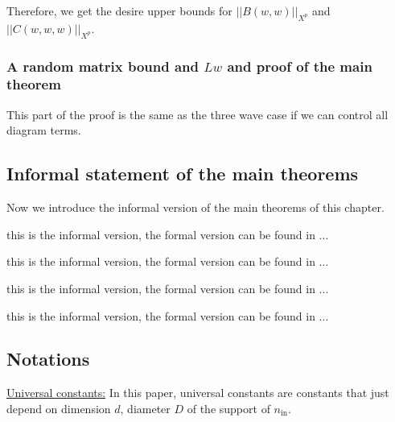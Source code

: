 Therefore, we get the desire upper bounds for $||B(w,w)||_{X^p}$ and $||C(w,w,w)||_{X^p}$.

\subsubsection{A random matrix bound and $Lw$ and proof of the main theorem}\label{sec.randmatintro} This part of the proof is the same as the three wave case if we can control all diagram terms.






\subsection{Informal statement of the main theorems}

Now we introduce the informal version of the main theorems of this chapter.


\begin{thm}\label{th.wickr_informal} this is the informal version, the formal version can be found in ...
\end{thm}

\begin{thm}\label{th.cancellation_informal} this is the informal version, the formal version can be found in ...
\end{thm}

\begin{thm}\label{th.loop_informal} this is the informal version, the formal version can be found in ...
\end{thm}

\begin{thm}\label{th.enough_informal} this is the informal version, the formal version can be found in ...
\end{thm}
 






 






 
\subsection{Notations}\label{sec.notat} 

\underline{Universal constants:} In this paper, universal constants are constants that just depend on dimension $d$, diameter $D$ of the support of $n_{\text{in}}$. 

